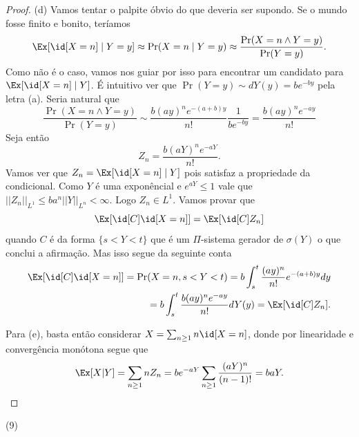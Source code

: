 \begin{proof}
	(d) Vamos tentar o palpite óbvio do que deveria ser supondo. Se o
	mundo fosse finito e bonito, teríamos
	\[
		\Ex[\id[X = n] \mid Y = y] \approx \Pr(X = n \mid Y = y) \approx
		\frac{\Pr(X = n \land Y = y)}{\Pr(Y = y)}.
	\]
	Como não é o caso, vamos nos guiar por isso para encontrar um
	candidato para $\Ex[\id[X = n] \mid Y]$.
	É intuitivo ver que $\Pr(Y = y) \sim dY(y) = be^{-by}$ pela letra
	(a). Seria natural que
	\[
		\frac{\Pr(X = n \land Y = y)}{\Pr(Y = y)} \sim
		\frac{b(ay)^ne^{-(a+b)y}}{n!} \frac{1}{be^{-by}} = \frac{b(ay)^n e^{-ay}}{n!}
	\]
	Seja então
	\[
		Z_n = \frac{b(aY)^n e^{-aY}}{n!}.
	\]
	Vamos ver que $Z_n = \Ex[\id[X = n] \mid Y]$ pois satisfaz a
	propriedade da condicional. Como $Y$ é uma exponêncial
	e $e^{aY} \leq 1$ vale que $||Z_n||_{L^1} \leq ba^n||Y||_{L^n} <
	\infty$. Logo $Z_n \in L^1$. Vamos provar que
	\[\Ex[\id[C] \id[X = n]] = \Ex[\id[C]Z_n]\]
	quando $C$ é da forma $\{s < Y < t\}$ que é um $\Pi$-sistema gerador
	de $\sigma(Y)$ o que conclui a afirmação.
	Mas isso segue da seguinte conta
	\begin{align*}
		\Ex[\id[C] \id[X = n]] = \Pr(X = n, s < Y < t) = b\int_s^t
		\frac{(ay)^n}{n!}e^{-(a+b)y}dy\\
		= b\int_s^t \frac{b(ay)^n e^{-ay}}{n!} dY(y) = \Ex[\id[C] Z_n].
	\end{align*}

	Para (e), basta então considerar $X = \sum_{n \geq 1} n\id[X = n]$,
	donde por linearidade e convergência monótona segue que
	\[
		\Ex[X | Y] = \sum_{n \geq 1} n Z_n = b e^{-aY}\sum_{n \geq 1}
		\frac{(aY)^n}{(n-1)!} = baY.
	\]
\end{proof}

\begin{exercise} (9)
\end{exercise}

